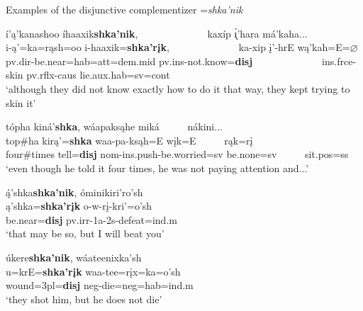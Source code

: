 \begin{exe}

\item\label{SkaPnikexamples} Examples of the disjunctive complementizer =\textit{shka'nik}

	\begin{xlist}
	
	\item\label{SkaPnikexamples1} 
	\glll í'ą'kanashoo íhaaxik\textbf{shka'nik}, ~ ~ ~ ~ ~ ~ ~ ~ kaxíp \'{ı̨}'hara má'kaha...\\
	i-ą'=ka=rąsh=oo i-haaxik=\textbf{shka'rįk}, ~ ~ ~ ~ ~ ~ ~ ~ ka-xip į'-hrE wą'kah=E=$\varnothing$\\
	pv.dir-\textnormal{be.near}=hab=att=dem.mid pv.ins-\textnormal{not.know}=\textbf{disj} ~ ~ ~ ~ ~ ~ ~ ~ ins.frce-\textnormal{skin} pv.rflx-caus \textnormal{lie}.aux.hab=sv=cont\\
	\glt `although they did not know exactly how to do it that way, they kept trying to skin it' \citep[197]{hollow1973a}

	\item\label{SkaPnikexamples2}
	\glll tópha kiná'\textbf{shka}, wáapaksąhe miká ~ ~ ~ nákini...\\
	top\#ha kirą'=\textbf{shka} waa-pa-ksąh=E wįk=E ~ ~ ~ rąk=rį\\
	\textnormal{four}\#\textnormal{times} \textnormal{tell}=\textbf{disj} nom-ins.push-\textnormal{be.worried}=sv \textnormal{be.none}=sv ~ ~ ~ sit.pos=ss\\
	\glt `even though he told it four times, he was not paying attention and...' \citep[156]{hollow1973a}

	\item\label{SkaPnikexamples3}
	\glll ą́'shka\textbf{shka'nik}, óminikiri'ro'sh\\
	ą'shka=\textbf{shka'rįk} o-w-rį-kri'=o'sh\\
	\textnormal{be.near}=\textbf{disj} pv.irr-1a-2s-\textnormal{defeat}=ind.m\\
	\glt `that may be so, but I will beat you' \citep[59]{hollow1973b}
	
	\item\label{SkaPnikexamples4}
	\glll úkere\textbf{shka'nik}, wáateenixka'sh\\
	u=krE=\textbf{shka'rįk} waa-tee=rįx=ka=o'sh\\
	\textnormal{wound}=3pl=\textbf{disj} neg-\textnormal{die}=neg=hab=ind.m\\
	\glt `they shot him, but he does not die' \citep[117]{hollow1973b}
	
	\end{xlist}

\end{exe}

